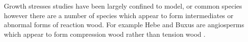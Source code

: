 Growth stresses studies have been largely confined to model, or common species
however there are a number of species which appear to form intermediates or
abnormal forms of reaction wood. For example Hebe and Buxus are angiosperms which appear
to form compression wood rather than tension wood \cite{Kojima_2011} \cite{Yoshizawa_1992}.